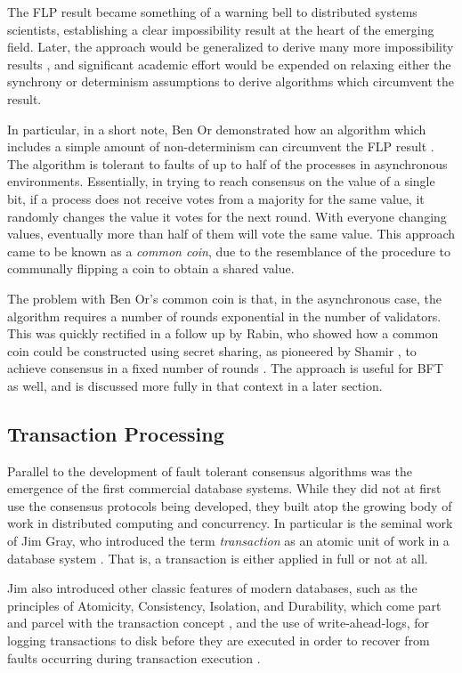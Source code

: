 The FLP result became something of a warning bell to distributed systems scientists, 
establishing a clear impossibility result at the heart of the emerging field.
Later, the approach would be generalized to derive many more impossibility results \cite{impossibility},
and significant academic effort would be expended on relaxing either the synchrony or determinism assumptions to derive algorithms which circumvent the result.

In particular, in a short note, 
Ben Or demonstrated how an algorithm which includes a simple amount of non-determinism can circumvent the FLP result \cite{free-choice}.
The algorithm is tolerant to faults of up to half of the processes in asynchronous environments.
Essentially, in trying to reach consensus on the value of a single bit, 
if a process does not receive votes from a majority for the same value, it randomly changes the value it votes for the next round.
With everyone changing values, eventually more than half of them will vote the same value.
This approach came to be known as a \emph{common coin},
due to the resemblance of the procedure to communally flipping a coin to obtain a shared value.

The problem with Ben Or's common coin is that, in the asynchronous case,
the algorithm requires a number of rounds exponential in the number of validators.
This was quickly rectified in a follow up by Rabin, who showed how a common coin
could be constructed using secret sharing, as pioneered by Shamir \cite{shamir1979share},
to achieve consensus in a fixed number of rounds \cite{rabin1983randomized}.
The approach is useful for BFT as well, and is discussed more fully in that context in a later section.

\subsection{Transaction Processing}

Parallel to the development of fault tolerant consensus algorithms was the emergence of the first commercial database systems.
While they did not at first use the consensus protocols being developed, 
they built atop the growing body of work in distributed computing and concurrency.
In particular is the seminal work of Jim Gray, who introduced the term \emph{transaction} 
as an atomic unit of work in a database system \cite{gray1981transaction}. 
That is, a transaction is either applied in full or not at all.

Jim also introduced other classic features of modern databases,
such as the principles of Atomicity, Consistency, Isolation, and Durability, 
which come part and parcel with the transaction concept \cite{gray1981transaction},
and the use of write-ahead-logs, for logging transactions to disk before they are executed
in order to recover from faults occurring during transaction execution \cite{gray1978notes}.

